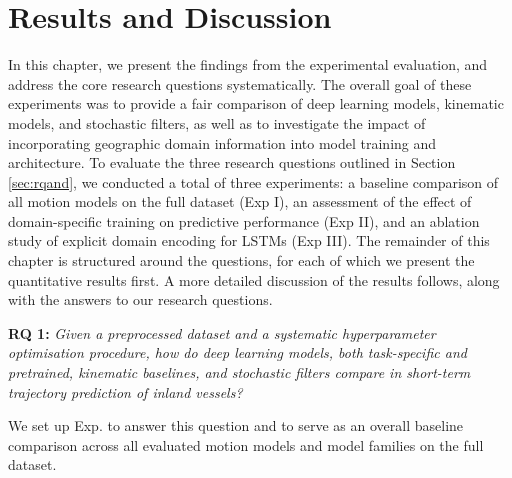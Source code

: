 \chapter{Results and Discussion}%
\acresetall %
\label{chap:results}


In this chapter, we present the findings from the experimental evaluation, and address the core research questions systematically.
The overall goal of these experiments was to provide a fair comparison of deep learning models, kinematic models, and stochastic filters, as well as to investigate the impact of incorporating geographic domain information into model training and architecture.
To evaluate the three research questions outlined in Section \ref{sec:rqand}, we conducted a total of three experiments: a baseline comparison of all motion models on the full dataset (Exp I), an assessment of the effect of domain-specific training on predictive performance (Exp II), and an ablation study of explicit domain encoding for LSTMs (Exp III).
The remainder of this chapter is structured around the  questions, for each of which we present the quantitative results first. A more detailed discussion of the results follows, along with the answers to our research questions.


 
\textbf{RQ 1:} \textit{Given a preprocessed dataset and a systematic hyperparameter optimisation procedure, how do deep learning models, both task-specific and pretrained, kinematic baselines, and stochastic filters compare in short-term trajectory prediction of inland vessels?}

We set up Exp.  to answer this question and to serve as an overall baseline comparison across all evaluated motion models and model families on the full dataset. 

